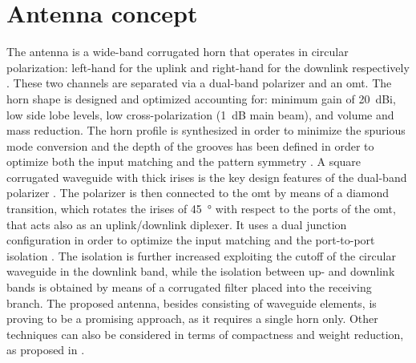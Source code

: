 \documentclass[conference,10pt,a4paper]{IEEEtran}%
\begin{document}
\section{Antenna concept}
\label{sec:ant-des}
The antenna is a wide-band corrugated horn that operates in circular polarization: left-hand for the uplink and right-hand for the downlink respectively
.
These two channels are separated via a dual-band polarizer and an \ac{omt}.
The horn shape is designed and optimized accounting for: minimum gain of \SI{20}{dBi}, low side lobe levels, low cross-polarization (\SI{1}{dB} main beam), and volume and mass reduction.
The horn profile is synthesized in order to minimize the spurious mode conversion and the depth of the grooves has been defined in order to optimize both the input matching and the pattern symmetry \cite{Teniente2002}.
A square corrugated waveguide with thick irises is the key design features of the dual-band polarizer \cite{Liu2008}.
The polarizer is then connected to the \ac{omt} by means of a diamond transition, which rotates the irises of \SI{45}{\degree} with respect to the ports of the \ac{omt}, that acts also as an uplink/downlink diplexer.
It uses a dual junction configuration in order to optimize the input matching and the port-to-port isolation \cite{DArcangelo2009}.
The isolation is further increased exploiting the cutoff of the circular waveguide in the downlink band, while the isolation between up- and downlink bands is obtained by means of a corrugated filter placed into the receiving branch.
The proposed antenna, besides consisting of waveguide elements, is proving to be a promising approach, as it requires a single horn only.
Other techniques can also be considered in terms of compactness and weight reduction, as proposed in \cite{Buttazzoni2017}.


\end{document}
